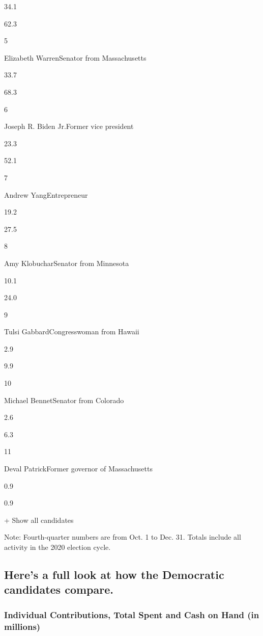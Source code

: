 34.1

62.3

5

Elizabeth WarrenSenator from Massachusetts

33.7

68.3

6

Joseph R. Biden Jr.Former vice president

23.3

52.1

7

Andrew YangEntrepreneur

19.2

27.5

8

Amy KlobucharSenator from Minnesota

10.1

24.0

9

Tulsi GabbardCongresswoman from Hawaii

2.9

9.9

10

Michael BennetSenator from Colorado

2.6

6.3

11

Deval PatrickFormer governor of Massachusetts

0.9

0.9

+ Show all candidates

Note: Fourth-quarter numbers are from Oct. 1 to Dec. 31. Totals include
all activity in the 2020 election cycle.

\hypertarget{heres-a-full-look-at-how-the-democratic-candidates-compare}{%
\subsection{Here's a full look at how the Democratic candidates
compare.}\label{heres-a-full-look-at-how-the-democratic-candidates-compare}}

\hypertarget{individual-contributions-total-spent-and-cash-on-hand-in-millions}{%
\subsubsection{Individual Contributions, Total Spent and Cash on Hand
(in
millions)}\label{individual-contributions-total-spent-and-cash-on-hand-in-millions}}

